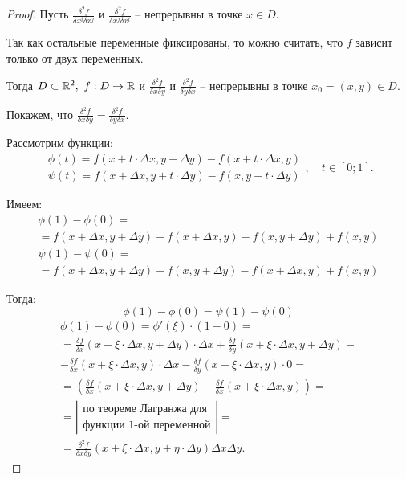 \begin{proof}
    Пусть $ \frac{\delta^2f}{\delta x^i\delta x^j} $ и $ \frac{\delta^2f}{\delta x^j\delta x^i} $ -- непрерывны в точке $ x\in D $.

    Так как остальные переменные фиксированы, то можно считать, что $ f $ зависит только от двух переменных.

    Тогда $ D\subset\mathbb{R}^2,\ f:D \rightarrow\mathbb{R} $ и $ \frac{\delta^2f}{\delta x\delta y} $ и $ \frac{\delta^2f}{\delta y\delta x} $ -- непрерывны в точке $ x_0 = (x,y) \in D $.

    Покажем, что $ \frac{\delta^2f}{\delta x\delta y} = \frac{\delta^2f}{\delta y\delta x} $.

    Рассмотрим функции:
    \[
        \begin{array}{l}
            \phi(t) = f(x+t\cdot\Delta x,y + \Delta y) - f(x + t\cdot \Delta x, y) \\
            \psi(t) = f(x + \Delta x, y + t\cdot \Delta y) - f(x,y+t\cdot\Delta y)
        \end{array}, \quad t \in [0;1].
    \]

    Имеем:
    \begin{multline*}
        \phi(1) - \phi(0) = \\
        = f(x + \Delta x, y + \Delta y) - f(x + \Delta x, y) - f(x,y+ \Delta y) + f(x,y)
    \end{multline*}
    \begin{multline*}
        \psi(1) - \psi(0) = \\
        = f(x + \Delta x,y + \Delta y) - f(x,y+\Delta y) - f(x+\Delta x,y) + f(x,y)
    \end{multline*}

    Тогда:
    \begin{equation}\label{eq:1}
        \phi(1) - \phi(0) =\psi(1) - \psi(0)
    \end{equation}
    \begin{multline*}
        \phi(1) - \phi(0) = \phi'(\xi) \cdot (1-0) = \\
        = \frac{\delta f}{\delta x}(x + \xi \cdot \Delta x, y + \Delta y)\cdot \Delta x + \frac{\delta f}{\delta y}(x + \xi \cdot \Delta x,y + \Delta y) - \\
        - \frac{\delta f}{\delta x}(x + \xi \cdot \Delta x,y) \cdot \Delta x - \frac{\delta f}{\delta y}(x + \xi \cdot \Delta x, y) \cdot 0 = \\
        = \left(\frac{\delta f}{\delta x}(x + \xi \cdot \Delta x, y + \Delta y) - \frac{\delta f}{\delta x}(x + \xi \cdot \Delta x, y) \right) = \\
        = \left|\begin{array}{c}
            \text{по теореме Лагранжа для} \\
            \text{функции 1-ой переменной}
        \end{array}\right| = \\
        = \frac{\delta^2 f}{\delta x \delta y}(x + \xi \cdot \Delta x, y + \eta \cdot \Delta y)\Delta x\Delta y.
    \end{multline*}


\end{proof}
